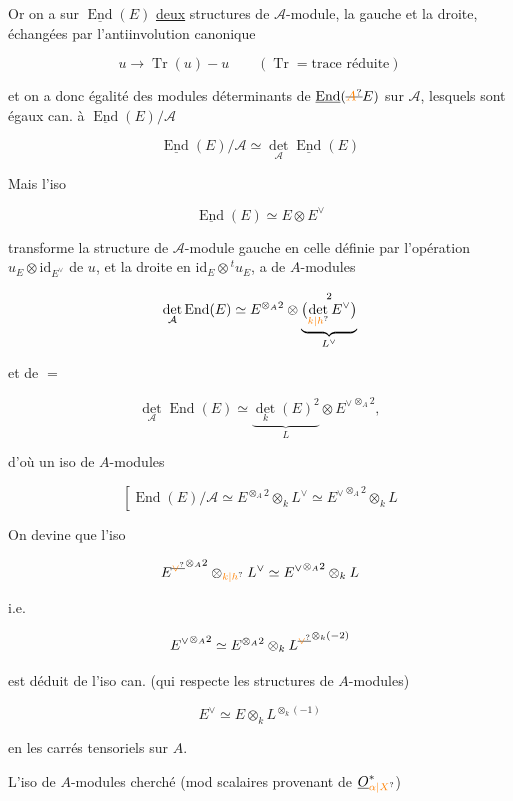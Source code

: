 Or on a sur $\underline{\operatorname{End}}(E)$ \uline{deux} structures de $\mathcal A$-module, la gauche et la droite, échangées par l'antiinvolution canonique

\[
u\longrightarrow\operatorname{Tr}(u)-u\qquad(\operatorname{Tr}=\text{trace réduite})
\]

et on a donc égalité des modules déterminants de $\underline{\operatorname{End}}(\deleted{\unsure{A}}E)$ sur  $\mathcal A$, lesquels sont égaux can. à $\underline{\operatorname{End}}(E)/\mathcal A$

\[
\underline{\operatorname{End}}(E)/\mathcal A\simeq\det_{\mathcal A}\underline{\operatorname{End}}(E)
\]

Mais l'iso

\[
\underline{\operatorname{End}}(E)\simeq E\otimes E^\vee
\]

transforme la structure de $\mathcal A$-module gauche en celle définie par l'opération $u_E\otimes\mathrm{id}_{E^\vee}$ de $u$, et la droite en $\mathrm{id}_E\otimes{}^tu_E$,  a   de $A$-modules

\[
\det_{\mathcal A}\operatorname{End}(E)\simeq E^{\otimes_A2}\otimes\underbrace{\bigl(\det_{\unsure{k|h}}E^\vee\bigr)}_{L^\vee}^{2}
\]

et de $=$

\[
\det_{\mathcal A}\operatorname{End}(E)\simeq\underbrace{\det_k(E)^{2}}_{L}\otimes {E^\vee}^{\otimes_A2},
\]

d'où un iso de $A$-modules

\[
\left[\operatorname{End}(E)/\mathcal A\simeq E^{\otimes_A2}\otimes_k L^\vee\simeq {E^\vee}^{\otimes_A2}\otimes_k L\right.
\]

On devine que l'iso

\[
{E^{\deleted{\unsure{\vee}}}}^{\otimes_A2}\otimes_{\unsure{k|h}}L^\vee\simeq {E^\vee}^{\otimes_A2}\otimes_k L
\]

i.e.

\[
{E^\vee}^{\otimes_A2}\simeq E^{\otimes_A2}\otimes_k{L^{\deleted{\unsure{\vee}}}}^{\otimes_k(-2)}
\]

est déduit de l'iso can. (qui respecte les structures de $A$-modules)

\[
E^\vee\simeq E\otimes_k L^{\otimes_k(-1)}
\]

en  les  carrés tensoriels sur $A$.

L'iso de $A$-modules cherché (mod scalaires provenant de $\underline O_{\unsure{\alpha|X}}^*$)

